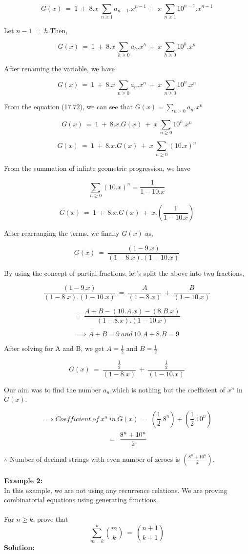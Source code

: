 $$ G(x)~=~1~+~8.x ~\sum_{n \geq 1} a_{n-1}.x^{n-1}~+~x~ \sum_{n \geq 1}10^{n-1}.x^{n-1} $$

Let $n-1~=~h$.Then,

$$ G(x)~=~1~+~8.x ~\sum_{h \geq 0} a_{h}.x^{h}~+~x~ \sum_{h \geq 0}10^{h}.x^{h} $$

After renaming the variable, we have

$$ G(x)~=~1~+~8.x ~\sum_{n \geq 0} a_{n}.x^{n}~+~x~ \sum_{n \geq 0}10^{n}.x^{n} $$

From the equation (17.72), we can see that $G(x) = \sum_{n \geq 0} a_n.x^n$

$$ G(x)~=~1~+~8.x.G(x)~+~x~ \sum_{n \geq 0}10^{n}.x^{n} $$

$$ G(x)~=~1~+~8.x.G(x)~+~x~ \sum_{n \geq 0}{(10.x)}^{n} $$

From the summation of infinte geometric progression, we have

$$\sum_{n \geq 0}{(10.x)}^{n} = \frac{1}{1-10.x}$$

$$ G(x)~=~1~+~8.x.G(x)~+~x.\left(\frac{1}{1-10.x}\right) $$

After rearranging the terms, we finally $G(x)$ as,

$$G(x)~=~\frac{\left(1-9.x\right)}{(1-8.x).(1-10.x)}$$

By using the concept of partial fractions, let's split the above into two fractions,

$$\frac{\left(1-9.x\right)}{(1-8.x).(1-10.x)} ~=~ \frac{A}{(1-8.x)}~+~\frac{B}{(1-10.x)}$$

$$=~\frac{A+B-(10.A.x)-(8.B.x)}{(1-8.x).(1-10.x)}$$

$$\implies A+B=9~and~10.A+8.B=9$$

After solving for A and B, we get $A=\frac{1}{2}$ and $B=\frac{1}{2}$

\begin{equation}
	G(x)~=~\frac{\frac{1}{2}}{(1-8.x)}~+~\frac{\frac{1}{2}}{(1-10.x)}
\end{equation}

Our aim was to find the number $a_n$,which is nothing but the coefficient of $x^n$ in $G(x)$.

$$\implies Coefficient~of~x^n~in~G(x)~=~ \left(\frac{1}{2}.8^n\right) + \left(\frac{1}{2}.10^n\right)$$
$$\hspace{1ex}=~\frac{8^n+10^n}{2}$$

$\therefore$ Number of decimal strings with even number of zeroes is $\left(\frac{8^n+10^n}{2}\right)$.
\\ \\
\textbf{Example 2:}\\
In this example, we are not using any recurrence relations. We are proving combinatorial equations using generating functions.
\\ \\
For $n \geq k$, prove that 
\begin{equation}
	\sum_{m=k}^{k}{m \choose k}~=~{n+1 \choose k+1}
\end{equation}
\textbf{Solution:}\\

